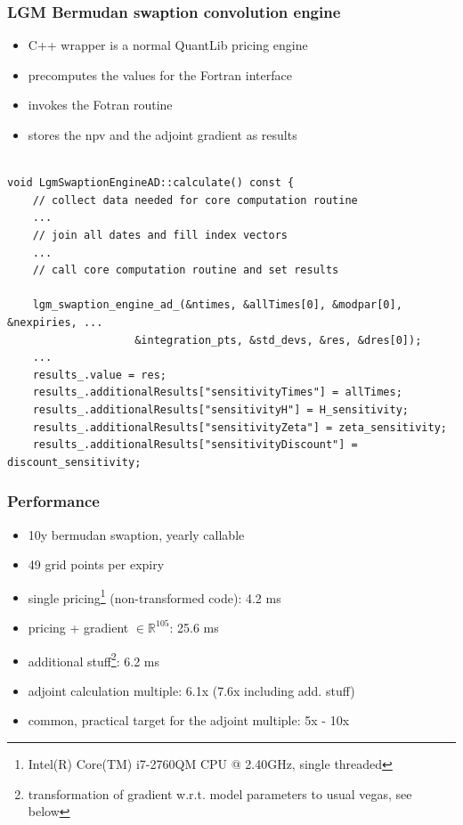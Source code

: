 \documentclass{beamer}
\begin{document}
\begin{frame}[fragile]
\frametitle{LGM Bermudan swaption convolution engine}
\begin{itemize}
\item C++ wrapper is a normal QuantLib pricing engine
\item precomputes the values for the Fortran interface
\item invokes the Fotran routine
\item stores the npv and the adjoint gradient as results
\end{itemize}
\begin{verbatim}

void LgmSwaptionEngineAD::calculate() const {
    // collect data needed for core computation routine
    ...
    // join all dates and fill index vectors
    ...
    // call core computation routine and set results

    lgm_swaption_engine_ad_(&ntimes, &allTimes[0], &modpar[0], &nexpiries, ...
                    &integration_pts, &std_devs, &res, &dres[0]);
    ...
    results_.value = res;
    results_.additionalResults["sensitivityTimes"] = allTimes;
    results_.additionalResults["sensitivityH"] = H_sensitivity;
    results_.additionalResults["sensitivityZeta"] = zeta_sensitivity;
    results_.additionalResults["sensitivityDiscount"] = discount_sensitivity;
\end{verbatim}
\end{frame}

\begin{frame}[fragile]
\frametitle{Performance}
\begin{itemize}
\item 10y bermudan swaption, yearly callable
\item 49 grid points per expiry
\item single pricing\footnote{Intel(R) Core(TM) i7-2760QM CPU @ 2.40GHz, single threaded} (non-transformed code): 4.2 ms
\item pricing + gradient $\in \mathbb{R}^{105}$: 25.6 ms
\item additional stuff\footnote{transformation of gradient w.r.t. model parameters to usual vegas, see below}: 6.2 ms
\item adjoint calculation multiple: 6.1x (7.6x including add. stuff)
\item common, practical target for the adjoint multiple: 5x - 10x
\end{itemize}
\end{frame}
\end{document}
